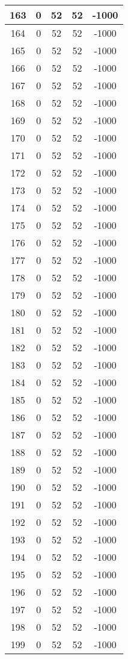 \documentclass[letterpaper, 12pt]{article}
\begin{document}
\begin{longtable}{|c|c|c|c|c|}
\hline
163 & 0 & 52 & 52 & -1000 \\
\hline
164 & 0 & 52 & 52 & -1000 \\
\hline
165 & 0 & 52 & 52 & -1000 \\
\hline
166 & 0 & 52 & 52 & -1000 \\
\hline
167 & 0 & 52 & 52 & -1000 \\
\hline
168 & 0 & 52 & 52 & -1000 \\
\hline
169 & 0 & 52 & 52 & -1000 \\
\hline
170 & 0 & 52 & 52 & -1000 \\
\hline
171 & 0 & 52 & 52 & -1000 \\
\hline
172 & 0 & 52 & 52 & -1000 \\
\hline
173 & 0 & 52 & 52 & -1000 \\
\hline
174 & 0 & 52 & 52 & -1000 \\
\hline
175 & 0 & 52 & 52 & -1000 \\
\hline
176 & 0 & 52 & 52 & -1000 \\
\hline
177 & 0 & 52 & 52 & -1000 \\
\hline
178 & 0 & 52 & 52 & -1000 \\
\hline
179 & 0 & 52 & 52 & -1000 \\
\hline
180 & 0 & 52 & 52 & -1000 \\
\hline
181 & 0 & 52 & 52 & -1000 \\
\hline
182 & 0 & 52 & 52 & -1000 \\
\hline
183 & 0 & 52 & 52 & -1000 \\
\hline
184 & 0 & 52 & 52 & -1000 \\
\hline
185 & 0 & 52 & 52 & -1000 \\
\hline
186 & 0 & 52 & 52 & -1000 \\
\hline
187 & 0 & 52 & 52 & -1000 \\
\hline
188 & 0 & 52 & 52 & -1000 \\
\hline
189 & 0 & 52 & 52 & -1000 \\
\hline
190 & 0 & 52 & 52 & -1000 \\
\hline
191 & 0 & 52 & 52 & -1000 \\
\hline
192 & 0 & 52 & 52 & -1000 \\
\hline
193 & 0 & 52 & 52 & -1000 \\
\hline
194 & 0 & 52 & 52 & -1000 \\
\hline
195 & 0 & 52 & 52 & -1000 \\
\hline
196 & 0 & 52 & 52 & -1000 \\
\hline
197 & 0 & 52 & 52 & -1000 \\
\hline
198 & 0 & 52 & 52 & -1000 \\
\hline
199 & 0 & 52 & 52 & -1000 \\
\hline
\end{longtable}
\end{document}
